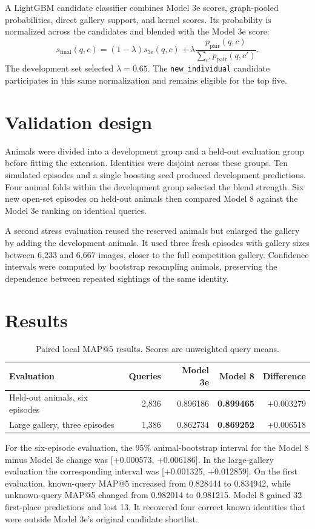 \documentclass[11pt]{article}
\begin{document}
A LightGBM candidate classifier combines Model 3e scores, graph-pooled probabilities, direct gallery support, and kernel scores. Its probability is normalized across the candidates and blended with the Model 3e score:
\[
s_{\mathrm{final}}(q,c)
= (1-\lambda)s_{\mathrm{3e}}(q,c)
+ \lambda\frac{p_{\mathrm{pair}}(q,c)}
{\sum_{c'}p_{\mathrm{pair}}(q,c')}.
\]
The development set selected $\lambda=0.65$. The \texttt{new\_individual} candidate participates in this same normalization and remains eligible for the top five.

\section{Validation design}
Animals were divided into a development group and a held-out evaluation group before fitting the extension. Identities were disjoint across these groups. Ten simulated episodes and a single boosting seed produced development predictions. Four animal folds within the development group selected the blend strength. Six new open-set episodes on held-out animals then compared Model 8 against the Model 3e ranking on identical queries.

A second stress evaluation reused the reserved animals but enlarged the gallery by adding the development animals. It used three fresh episodes with gallery sizes between 6,233 and 6,667 images, closer to the full competition gallery. Confidence intervals were computed by bootstrap resampling animals, preserving the dependence between repeated sightings of the same identity.

\section{Results}
\begin{table}[h]
\centering
\caption{Paired local MAP@5 results. Scores are unweighted query means.}
\begin{tabular}{lrrrr}
\toprule
Evaluation & Queries & Model 3e & Model 8 & Difference \\
\midrule
Held-out animals, six episodes & 2,836 & 0.896186 & \textbf{0.899465} & +0.003279 \\
Large gallery, three episodes & 1,386 & 0.862734 & \textbf{0.869252} & +0.006518 \\
\bottomrule
\end{tabular}
\end{table}

For the six-episode evaluation, the 95\% animal-bootstrap interval for the Model 8 minus Model 3e change was [+0.000573, +0.006186]. In the large-gallery evaluation the corresponding interval was [+0.001325, +0.012859]. On the first evaluation, known-query MAP@5 increased from 0.828444 to 0.834942, while unknown-query MAP@5 changed from 0.982014 to 0.981215. Model 8 gained 32 first-place predictions and lost 13. It recovered four correct known identities that were outside Model 3e's original candidate shortlist.
\end{document}
